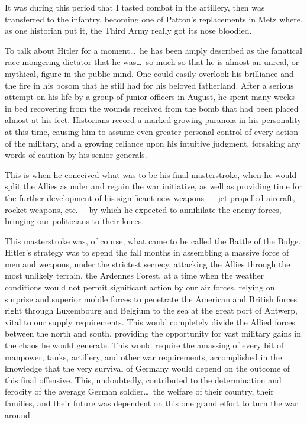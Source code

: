 \documentclass[../m3y]{subfiles}
\begin{document}
It was during this period that I tasted combat in the artillery, then was transferred to the infantry, becoming one of Patton's replacements in Metz where, as one historian put it, the Third Army really got its nose bloodied.

To talk about Hitler for a moment\ldots\ he has been amply described as the fanatical race-mongering dictator that he was\ldots\ so much so that he is almost an unreal, or mythical, figure in the public mind. One could easily overlook his brilliance and the fire in his bosom that he still had for his beloved fatherland. After a serious attempt on his life by a group of junior officers in August, he spent many weeks in bed recovering from the wounds received from the bomb that had been placed almost at his feet. Historians record a marked growing paranoia in his personality at this time, causing him to assume even greater personal control of every action of the military, and a growing reliance upon his intuitive judgment, forsaking any words of caution by his senior generals.

This is when he conceived what was to be his final masterstroke, when he would split the Allies asunder and regain the war initiative, as well as providing time for the further development of his significant new weapons --- jet-propelled aircraft, rocket weapons, etc.\@ --- by which he expected to annihilate the enemy forces, bringing our politicians to their knees.

This masterstroke was, of course, what came to be called the Battle of the Bulge. Hitler's strategy was to spend the fall months in assembling a massive force of men and weapons, under the strictest secrecy, attacking the Allies through the most unlikely terrain, the Ardennes Forest, at a time when the weather conditions would not permit significant action by our air forces, relying on surprise and superior mobile forces to penetrate the American and British forces right through Luxembourg and Belgium to the sea at the great port of Antwerp, vital to our supply requirements. This would completely divide the Allied forces between the north and south, providing the opportunity for vast military gains in the chaos he would generate. This would require the amassing of every bit of manpower, tanks, artillery, and other war requirements, accomplished in the knowledge that the very survival of Germany would depend on the outcome of this final offensive. This, undoubtedly, contributed to the determination and ferocity of the average German soldier\ldots\ the welfare of their country, their families, and their future was dependent on this one grand effort to turn the war around.
\end{document}
